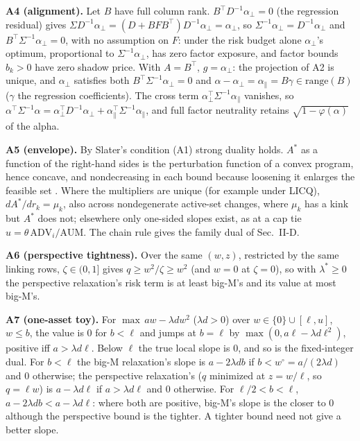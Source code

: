 \documentclass[conference]{IEEEtran}
\newcommand{\T}{^{\top}}
\begin{document}
\textbf{A4 (alignment).} Let $B$ have full column rank. $B\T D^{-1}\alpha_\perp=0$ (the regression residual) gives $\Sigma D^{-1}\alpha_\perp=(D+BFB\T)D^{-1}\alpha_\perp=\alpha_\perp$, so $\Sigma^{-1}\alpha_\perp=D^{-1}\alpha_\perp$ and $B\T\Sigma^{-1}\alpha_\perp=0$, with no assumption on $F$: under the risk budget alone $\alpha_\perp$'s optimum, proportional to $\Sigma^{-1}\alpha_\perp$, has zero factor exposure, and factor bounds $b_k>0$ have zero shadow price. With $A=B\T$, $g=\alpha_\perp$: the projection of A2 is unique, and $\alpha_\perp$ satisfies both $B\T\Sigma^{-1}\alpha_\perp=0$ and $\alpha-\alpha_\perp=\alpha_\parallel=B\gamma\in\mathrm{range}(B)$ ($\gamma$ the regression coefficients). The cross term $\alpha_\perp\T\Sigma^{-1}\alpha_\parallel$ vanishes, so $\alpha\T\Sigma^{-1}\alpha=\alpha_\perp\T D^{-1}\alpha_\perp+\alpha_\parallel\T\Sigma^{-1}\alpha_\parallel$, and full factor neutrality retains $\sqrt{1-\varphi(\alpha)}$ of the alpha.

\textbf{A5 (envelope).} By Slater's condition (A1) strong duality holds. $A^*$ as a function of the right-hand sides is the perturbation function of a convex program, hence concave, and nondecreasing in each bound because loosening it enlarges the feasible set \cite{boyd2004convex}. Where the multipliers are unique (for example under LICQ), $dA^*/dr_k=\mu_k$, also across nondegenerate active-set changes, where $\mu_k$ has a kink but $A^*$ does not; elsewhere only one-sided slopes exist, as at a cap tie $u=\theta\,\mathrm{ADV}_i/\mathrm{AUM}$. The chain rule gives the family dual of Sec.~II-D.

\textbf{A6 (perspective tightness).} Over the same $(w,z)$, restricted by the same linking rows, $\zeta\in(0,1]$ gives $q\ge w^2/\zeta\ge w^2$ (and $w=0$ at $\zeta=0$), so with $\lambda^*\ge0$ the perspective relaxation's risk term is at least big-M's and its value at most big-M's.

\textbf{A7 (one-asset toy).} For $\max\,aw-\lambda dw^2$ ($\lambda d>0$) over $w\in\{0\}\cup[\ell,u]$, $w\le b$, the value is 0 for $b<\ell$ and jumps at $b=\ell$ by $\max(0,a\ell-\lambda d\ell^2)$, positive iff $a>\lambda d\ell$. Below $\ell$ the true local slope is 0, and so is the fixed-integer dual. For $b<\ell$ the big-M relaxation's slope is $a-2\lambda db$ if $b<w^\circ=a/(2\lambda d)$ and 0 otherwise; the perspective relaxation's ($q$ minimized at $z=w/\ell$, so $q=\ell w$) is $a-\lambda d\ell$ if $a>\lambda d\ell$ and 0 otherwise. For $\ell/2<b<\ell$, $a-2\lambda db<a-\lambda d\ell$: where both are positive, big-M's slope is the closer to 0 although the perspective bound is the tighter. A tighter bound need not give a better slope.
\end{document}
